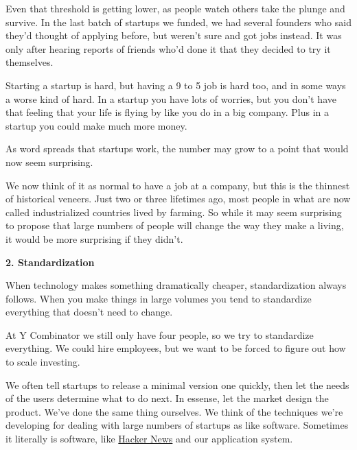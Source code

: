 Even that threshold is getting lower,
                    as people watch others take the plunge and survive. In the
                    last batch of startups we funded, we had several founders
                    who said they'd thought of applying before, but weren't sure
                    and got jobs instead. It was only after hearing reports of
                    friends who'd done it that they decided to try it
                    themselves.

Starting a startup is hard, but
                    having a 9 to 5 job is hard too, and in some ways a worse
                    kind of hard. In a startup you have lots of worries, but you
                    don't have that feeling that your life is flying by like you
                    do in a big company. Plus in a startup you could make much
                    more money.

As word spreads that startups work,
                    the number may grow to a point that would now seem
                    surprising.

We now think of it as normal to have
                    a job at a company, but this is the thinnest of historical
                    veneers. Just two or three lifetimes ago, most people in
                    what are now called industrialized countries lived by
                    farming. So while it may seem surprising to propose that
                    large numbers of people will change the way they make a
                    living, it would be more surprising if they didn't.

\textbf{2. Standardization}

When technology makes something dramatically
                    cheaper, standardization always follows. When you make
                    things in large volumes you tend to standardize everything
                    that doesn't need to change.

At Y Combinator we
                    still only have four people, so we try to standardize
                    everything. We could hire employees, but we want to be
                    forced to figure out how to scale investing.

We
                    often tell startups to release a minimal version one
                    quickly, then let the needs of the users determine what to
                    do next. In essense, let the market design the product.
                    We've done the same thing ourselves. We think of the
                    techniques we're developing for dealing with large numbers
                    of startups as like software. Sometimes it literally is
                    software, like
                    \href{http://news.ycombinator.com}{Hacker News} and
                    our application system.


